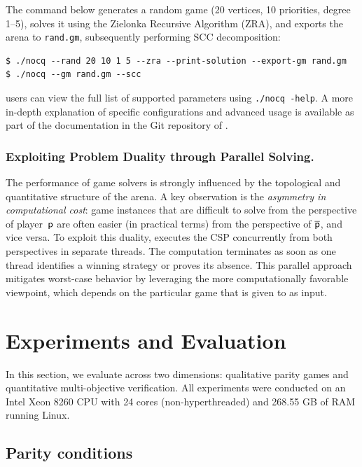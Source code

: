 \documentclass[a4paper,UKenglish,cleveref, autoref, thm-restate, anonymous]{lipics-v2021}
\begin{document}
The command below generates a random game (20 vertices, 10 priorities, degree 1–5), solves it using the Zielonka Recursive Algorithm (ZRA), and exports the arena to \texttt{rand.gm}, subsequently performing SCC decomposition:

\begin{lstlisting}
$ ./nocq --rand 20 10 1 5 --zra --print-solution --export-gm rand.gm
$ ./nocq --gm rand.gm --scc
\end{lstlisting}

\noindent \nocq users can view the full list of supported parameters using \texttt{./nocq -\-help}. A more in-depth explanation of specific configurations and advanced usage is available as part of the documentation in the Git repository of \nocq. 

\subsubsection{Exploiting Problem Duality through Parallel Solving.}

The performance of game solvers is strongly influenced by the topological and quantitative structure of the arena. A key observation is the \emph{asymmetry in computational cost}: game instances that are difficult to solve from the perspective of player~$\mathsf{p}$ are often easier (in practical terms) from the perspective of $\overline{\mathsf{p}}$, and vice versa.
%
To exploit this duality, \nocq executes the CSP concurrently from both perspectives in separate threads. The computation terminates as soon as one thread identifies a winning strategy or proves its absence. This parallel approach mitigates worst-case behavior by leveraging the more computationally favorable viewpoint, which depends on the particular game that is given to \nocq as input. 


\section{Experiments and Evaluation}\label{sec:experiments}

In this section, we evaluate \nocq across two dimensions: qualitative parity games and quantitative multi-objective verification. All experiments were conducted on an Intel Xeon 8260 CPU with 24 cores (non-hyperthreaded) and 268.55 GB of RAM running Linux.


\subsection{Parity conditions}
\end{document}
